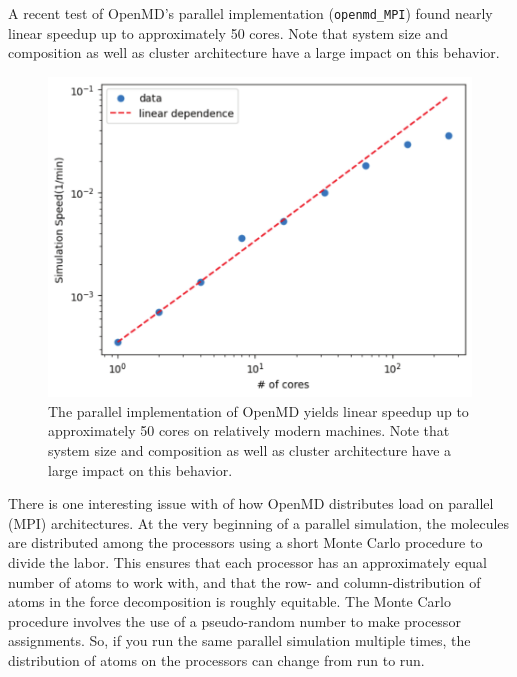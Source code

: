 \documentclass[letterpaper]{report}
\begin{document}
A recent test of OpenMD's parallel implementation ({\tt openmd\_MPI}) found nearly linear
speedup up to approximately 50 cores.  Note that system size and
composition as well as cluster architecture have a large impact on
this behavior.

\begin{figure}
\centering
\includegraphics[width=\linewidth]{parallelPerf.pdf}
\caption[Performance of openmd\_MPI on parallel machines]{The
  parallel implementation of OpenMD yields linear speedup up to
  approximately 50 cores on relatively modern machines. Note that
  system size and composition as well as cluster architecture have a
  large impact on this behavior.}
\label{fig:parallelPerf}
\end{figure}


There is one interesting issue with of how OpenMD distributes load on
parallel (MPI) architectures.  At the very beginning of a parallel
simulation, the molecules are distributed among the processors using a
short Monte Carlo procedure to divide the labor.  This ensures that
each processor has an approximately equal number of atoms to work
with, and that the row- and column-distribution of atoms in the force
decomposition is roughly equitable. The Monte Carlo procedure
involves the use of a pseudo-random number to make processor
assignments. So, if you run the same parallel simulation multiple
times, the distribution of atoms on the processors can change from run
to run.
\end{document}
